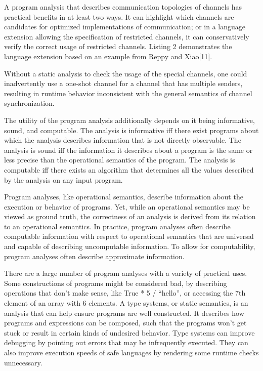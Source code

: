\documentclass{article}
\begin{document}
A program analysis that describes communication topologies of channels has practical benefits
in at least two ways.  It can highlight which channels are candidates for optimized
implementations of communication; or in a language extension allowing the specification of
restricted channels, it can conservatively verify the correct usage of restricted channels.
Listing 2 demonstrates the language extension based on an example from Reppy and Xiao[11].


Without a static analysis to check the usage of the special channels, one could inadvertently
use a one-shot channel for a channel that has multiple senders, resulting in runtime behavior
inconsistent with the general semantics of channel synchronization.

The utility of the program analysis additionally depends on it being informative, sound, and
computable.  The analysis is informative iff there exist programs about which the analysis
describes information that is not directly observable.  The analysis is sound iff the
information it describes about a program is the same or less precise than the operational
semantics of the program. The analysis is computable iff there exists an algorithm that
determines all the values described by the analysis on any input program.

Program analyses, like operational semantics, describe information about the execution or
behavior of programs.  Yet, while an operational semantics may be viewed as ground truth, the
correctness of an analysis is derived from its relation to an operational semantics.  In
practice, program analyses often describe computable information with respect to operational
semantics that are universal and capable of describing uncomputable information.  To allow for
computability, program analyses often describe approximate information.

There are a large number of program analyses with a variety of practical uses.  Some
constructions of programs might be considered bad, by describing operations that don't make
sense, like True * 5 / “hello”, or accessing the 7th element of an array with 6 elements.  A
type systems, or static semantics, is an analysis that can help ensure programs are well
constructed.  It describes how programs and expressions can be composed, such that the programs
won't get stuck or result in certain kinds of undesired behavior.  Type systems can improve
debugging by pointing out errors that may be infrequently executed.  They can also improve
execution speeds of safe languages by rendering some runtime checks unnecessary.  
\end{document}
